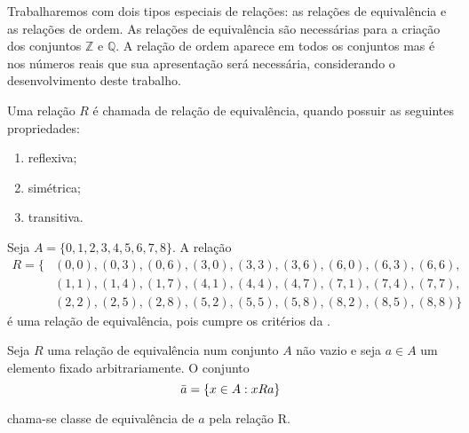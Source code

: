 \documentclass[../main.tex]{subfiles}
\begin{document}
Trabalharemos com dois tipos especiais de relações: as relações de equivalência e as relações de ordem. As relações de equivalência são necessárias para a criação dos conjuntos $\mathbb{Z}$ e $\mathbb{Q}$. A relação de ordem aparece em todos os conjuntos mas é nos números reais que sua apresentação será necessária, considerando o desenvolvimento deste trabalho.

\begin{defi}\label{agb-def-relacaoEquivalencia}
    Uma relação $R$ é chamada de relação de equivalência, quando possuir as seguintes propriedades:
    \begin{enumerate}[label=(\roman*)]
        \item reflexiva;
        \item simétrica;
        \item transitiva.
    \end{enumerate}
\end{defi}

\begin{ex}\label{agb-ex-restosDiv3}
    Seja $A = \{0,1,2,3,4,5,6,7,8\}$. A relação 
    \begin{align*}
        R = \{ & (0,0), (0,3), (0,6), (3,0), (3,3), (3,6), (6,0),(6,3), (6,6), \\
    & (1,1), (1,4), (1,7), (4,1), (4,4), (4,7), (7,1), (7,4), (7,7), \\
    & (2,2), (2,5), (2,8), (5,2), (5,5), (5,8), (8,2), (8,5), (8,8) \}
    \end{align*}
    é uma relação de equivalência, pois cumpre os critérios da .    
\end{ex}


\begin{defi}\label{agb-def-classeEquivalencia}
    Seja $R$ uma relação de equivalência num conjunto $A$ não vazio e seja $a \in A$ um elemento fixado arbitrariamente. O conjunto \\
    \[ \Bar{a} = \{x \in A : xRa\} \]
    
    chama-se classe de equivalência de $a$ pela relação R.
\end{defi}
\end{document}
